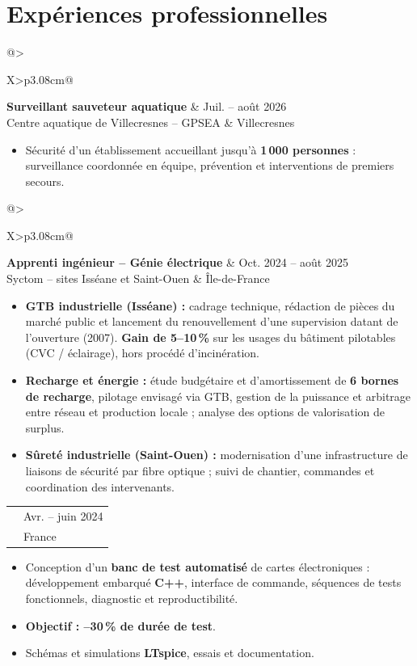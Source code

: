 \documentclass[9pt,a4paper]{extarticle}
\makeatletter
\newcommand{\entry}[4]{%
\begin{tabularx}{\linewidth}{@{}>{\raggedright\arraybackslash}X>{\raggedleft\arraybackslash}p{3.08cm}@{}}
 {\bfseries\color{bleu}#1} & {\fontsize{8.5}{9.3}\selectfont\color{secondaire}#2} \\[-2pt]
 {\fontsize{8.5}{9.6}\selectfont\color{secondaire}#3} & {\fontsize{8.5}{9.3}\selectfont\color{secondaire}#4}
\end{tabularx}\vspace{-3.4pt}\par}
\newcommand{\gapentry}{\vspace{3.1pt}}
\makeatother
\begin{document}
{\section{Expériences professionnelles}
\entry{Surveillant sauveteur aquatique}{Juil. -- août 2026}{Centre aquatique de Villecresnes -- GPSEA}{Villecresnes}
\begin{itemize}
  \item Sécurité d'un établissement accueillant jusqu'à \textbf{1\,000 personnes} : surveillance coordonnée en équipe, prévention et interventions de premiers secours.
\end{itemize}
\entry{Apprenti ingénieur -- Génie électrique}{Oct. 2024 -- août 2025}{Syctom -- sites Isséane et Saint-Ouen}{Île-de-France}
\begin{itemize}
  \item \textbf{GTB industrielle (Isséane) :} cadrage technique, rédaction de pièces du marché public et lancement du renouvellement d'une supervision datant de l'ouverture (2007). \textbf{Gain de 5--10\,\%} sur les usages du bâtiment pilotables (CVC / éclairage), hors procédé d'incinération.
  \item \textbf{Recharge et énergie :} étude budgétaire et d'amortissement de \textbf{6 bornes de recharge}, pilotage envisagé via GTB, gestion de la puissance et arbitrage entre réseau et production locale ; analyse des options de valorisation de surplus.
  \item \textbf{Sûreté industrielle (Saint-Ouen) :} modernisation d'une infrastructure de liaisons de sécurité par fibre optique ; suivi de chantier, commandes et coordination des intervenants.
\end{itemize}
\gapentry
\entry{Stagiaire technicien électronicien supérieur}{Avr. -- juin 2024}{Cobham Aerospace Communications}{France}
\begin{itemize}
    \item Conception d'un \textbf{banc de test automatisé} de cartes électroniques : développement embarqué \textbf{C++}, interface de commande, séquences de tests fonctionnels, diagnostic et reproductibilité.
    \item \textbf{Objectif : --30\,\% de durée de test}.
    \item Schémas et simulations \textbf{LTspice}, essais et documentation.
\end{itemize}
\gapentry

}
\end{document}
